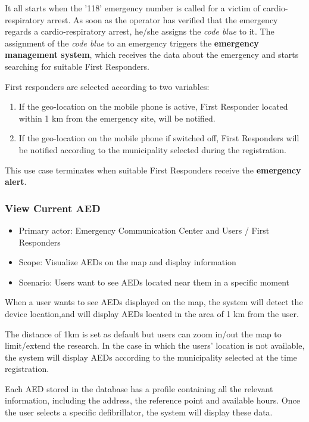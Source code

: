 \documentclass[11pt,a4paper]{article}
\begin{document}
It all starts when the '118' emergency number is called for a victim of cardio-respiratory arrest.
%
As soon as the operator has verified that the emergency regards a cardio-respiratory arrest, he/she assigns the \textit{code blue} to it.
%
The assignment of the \textit{code blue} to an emergency triggers the \textbf{emergency management system}, which receives the data about the emergency and starts searching for suitable First Responders.

 First responders are selected according to two variables:

 \begin{enumerate}
     \item If the geo-location on the mobile phone is active, First Responder located within 1 km from the emergency site, will be notified.
     \item If the geo-location on the mobile phone if switched off, First Responders will be notified according to the municipality selected during the registration.
 \end{enumerate}

This use case terminates when suitable First Responders receive the \textbf{emergency alert}.

\subsubsection*{View Current AED}

\begin{itemize}
    \item Primary actor: Emergency Communication Center and Users / First Responders
    \item Scope: Visualize AEDs on the map and display information
    \item Scenario: Users want to see AEDs located near them in a specific moment
\end{itemize}

When a user wants to see AEDs displayed on the map, the system will detect the device location,and will display AEDs located in the area of 1 km from the user.

The distance of 1km is set as default but users can zoom in/out the map to limit/extend the research.
%
In the case in which the users' location is not available, the system will display AEDs according to the municipality selected at the time registration.

Each AED stored in the database has a profile containing all the relevant information, including the address, the reference point and available hours.
%
Once the user selects a specific defibrillator, the system will display these data.
\end{document}
